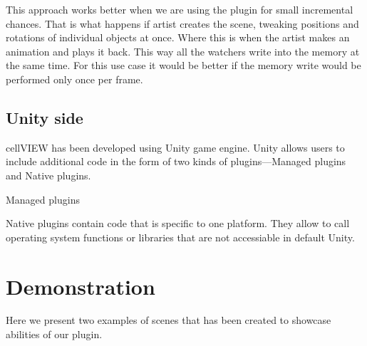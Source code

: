 \documentclass[
  digital, %
  table,   %
  nolof,     %
  nolot,     %
]{fithesis3}
\begin{document}
This approach works better when we are using the plugin for small incremental chances. That is what happens if artist creates the scene, tweaking positions and rotations of individual objects at once. Where this is when the artist makes an animation and plays it back. This way all the watchers write into the memory at the same time. For this use case it would be better if the memory write would be performed only once per frame.

\section{Unity side}
cellVIEW has been developed using Unity game engine. Unity allows users to include additional code in the form of two kinds of plugins—Managed plugins and Native plugins.

Managed plugins

Native plugins contain code that is specific to one platform. They allow to call operating system functions or libraries that are not accessiable in default Unity.

\chapter{Demonstration}
Here we present two examples of scenes that has been created to showcase abilities of our plugin.
\end{document}
